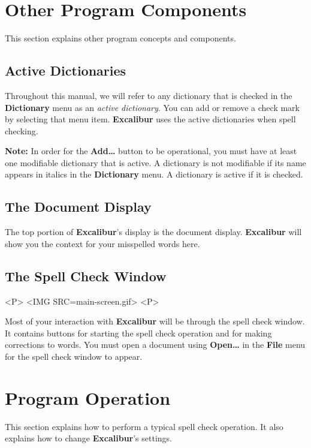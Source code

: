 \documentclass[11pt,titlepage]{article}
\newcommand{\ex}{\textbf{Excalibur}}
\begin{document}
\section{Other Program Components}

This section explains other program concepts and components.

\subsection{Active Dictionaries}
\label{sec:act-dict}

Throughout this manual, we will refer to any dictionary that is
checked in the \textbf{Dictionary} menu as an \emph{active
  dictionary}.  You can add or remove a check mark by selecting that
menu item. \ex{} uses the active dictionaries when spell checking.

\textbf{Note:} In order for the \textbf{Add\ldots} button to be
operational, you must have at least one modifiable dictionary that is
active.  A dictionary is not modifiable if its name appears in italics
in the \textbf{Dictionary} menu.  A dictionary is active if it is
checked.

\subsection{The Document Display}

The top portion of \ex's display is the document display. \ex{} will
show you the context for your misspelled words here.

\subsection{The Spell Check Window}

\begin{rawhtml}
<P>
<IMG SRC=main-screen.gif>
<P>
\end{rawhtml}

Most of your interaction with \ex{} will be through the spell check
window. It contains buttons for starting the spell check operation and
for making corrections to words. You must open a document using
\textbf{Open\ldots} in the \textbf{File} menu for the spell check
window to appear.

\section{Program Operation}

This section explains how to perform a typical spell check operation.
It also explains how to change \ex's settings.
\end{document}
